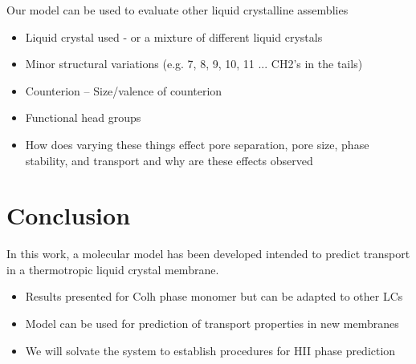 \documentclass{article}
\begin{document}
\begin{itemize}
\begin{itemize}
\begin{itemize}
\begin{itemize}
	\end{itemize}

	Our model can be used to evaluate other liquid crystalline assemblies
		\begin{itemize}
			\item Liquid crystal used - or a mixture of different liquid crystals
			\item Minor structural variations (e.g. 7, 8, 9, 10, 11 ... CH2's in the tails)
			\item Counterion -- Size/valence of counterion
			\item Functional head groups
			\item How does varying these things effect pore separation, pore size, phase stability, and transport and why are these effects observed
		\end{itemize} 
		
	\section{Conclusion}

	In this work, a molecular model has been developed intended to predict transport in a thermotropic liquid crystal membrane. 
	\begin{itemize}
		\item Results presented for Colh phase monomer but can be adapted to other LCs
		\item Model can be used for prediction of transport properties in new membranes
		\item We will solvate the system to establish procedures for HII phase prediction
	\end{itemize}
	
	
\end{document}

